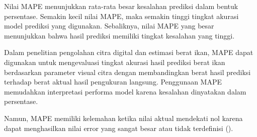 Nilai MAPE menunjukkan rata-rata besar kesalahan prediksi dalam bentuk
persentase. Semakin kecil nilai MAPE, maka semakin tinggi tingkat akurasi
model prediksi yang digunakan. Sebaliknya, nilai MAPE yang besar menunjukkan
bahwa hasil prediksi memiliki tingkat kesalahan yang tinggi.

Dalam penelitian pengolahan citra digital dan estimasi berat ikan, MAPE dapat
digunakan untuk mengevaluasi tingkat akurasi hasil prediksi berat ikan
berdasarkan parameter visual citra dengan membandingkan berat hasil prediksi
terhadap berat aktual hasil pengukuran langsung. Penggunaan MAPE memudahkan
interpretasi performa model karena kesalahan dinyatakan dalam persentase.

Namun, MAPE memiliki kelemahan ketika nilai aktual mendekati nol karena dapat
menghasilkan nilai error yang sangat besar atau tidak terdefinisi
(\textcite{Hyndman2006}).







